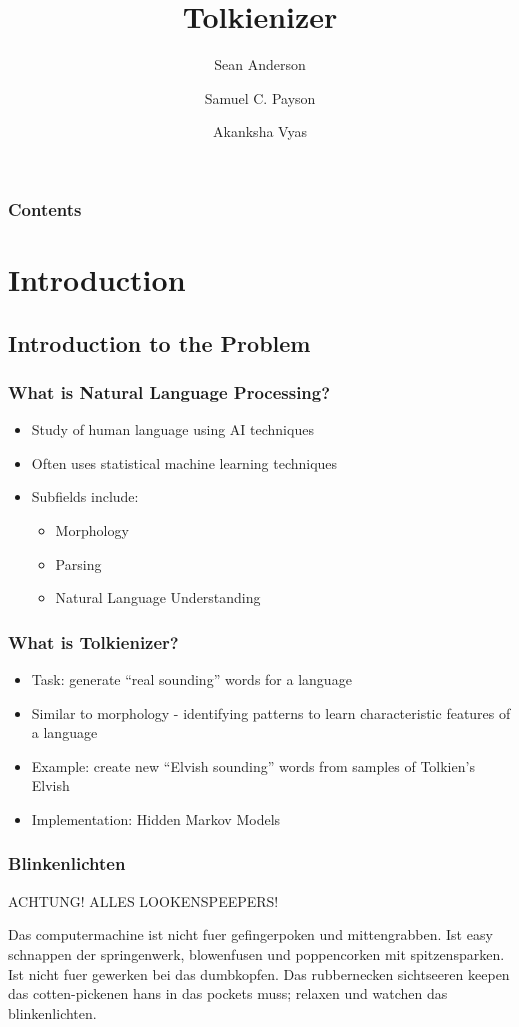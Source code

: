 \documentclass{beamer}
\title{Tolkienizer}
\author{Sean Anderson \and Samuel C. Payson \and Akanksha Vyas}
\begin{document}
\begin{frame}
\titlepage
\end{frame}

\begin{frame}
   \frametitle{Contents}
   \tableofcontents
\end{frame}

\section{Introduction}

\subsection{Introduction to the Problem}

\begin{frame}
   \frametitle{What is Natural Language Processing?}
   \begin{itemize}
      \item Study of human language using AI techniques
      \item Often uses statistical machine learning techniques
      \item Subfields include:
      \begin{itemize}
         \item Morphology
         \item Parsing
         \item Natural Language Understanding
      \end{itemize}
   \end{itemize}
\end{frame}

\begin{frame}
   \frametitle{What is Tolkienizer?}
   \begin{itemize}
      \item Task: generate ``real sounding'' words for a language
      \item Similar to morphology - identifying patterns to learn
      characteristic features of a language
      \item Example: create new ``Elvish sounding'' words from samples of Tolkien's Elvish
      \item Implementation: Hidden Markov Models
   \end{itemize}
\end{frame}

\begin{frame}
   \frametitle{Blinkenlichten}
   ACHTUNG! ALLES LOOKENSPEEPERS!

    Das computermachine ist nicht fuer gefingerpoken und
    mittengrabben. Ist easy schnappen der springenwerk, blowenfusen
    und poppencorken mit spitzensparken. Ist nicht fuer gewerken bei
    das dumbkopfen. Das rubbernecken sichtseeren keepen das
    cotten-pickenen hans in das pockets muss; relaxen und watchen das
    blinkenlichten.
\end{frame}
\end{document}
